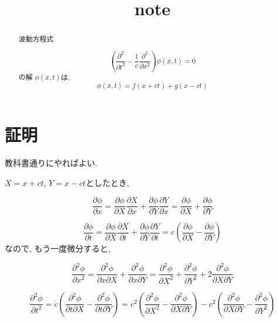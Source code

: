 \documentclass{jsarticle} \usepackage[dvipdfmx]{graphicx} \usepackage[dvipdfmx]{hyperref}
\title{note}
\begin{document}
\maketitle

\begin{abstract}
  波動方程式
  
  \begin{equation}
    \left( \frac{\partial^2}{\partial t^2} - \frac{1}{c}\frac{\partial^2}{\partial x^2} \right) \phi(x, t) = 0
  \end{equation}
  の解 $\phi(x, t)$は, 
  \begin{equation}
    \phi(x, t) = f(x + ct) + g(x - ct)
  \end{equation}
\end{abstract}

\section{証明}
教科書通りにやればよい. 

$X = x + ct$, $Y = x - ct$としたとき, 

\begin{equation}
  \frac{\partial \phi}{\partial x}
    = \frac{\partial \phi}{\partial X}\frac{\partial X}{\partial x}
    + \frac{\partial \phi}{\partial Y}\frac{\partial Y}{\partial x}
    = \frac{\partial \phi}{\partial X} + \frac{\partial \phi}{\partial Y}
\end{equation}

\begin{equation}
  \frac{\partial \phi}{\partial t}
    = \frac{\partial \phi}{\partial X}\frac{\partial X}{\partial t}
    + \frac{\partial \phi}{\partial Y}\frac{\partial Y}{\partial t}
    = c \left( \frac{\partial \phi}{\partial X} - \frac{\partial \phi}{\partial Y} \right)
\end{equation}
なので, もう一度微分すると, 

\begin{equation}
  \frac{\partial^2 \phi}{\partial x^2} = \frac{\partial^2 \phi}{\partial x \partial X} + \frac{\partial^2 \phi}{\partial x \partial Y}
  = \frac{\partial^2 \phi}{\partial X^2} + \frac{\partial^2 \phi}{\partial Y^2} + 2\frac{\partial^2 \phi}{\partial X \partial Y}
\end{equation}

\begin{equation}
  \frac{\partial^2 \phi}{\partial t^2} = c \left( \frac{\partial^2 \phi}{\partial t \partial X} - \frac{\partial^2 \phi}{\partial t \partial Y} \right)
  = c^2 \left( \frac{\partial^2 \phi}{\partial X^2} - \frac{\partial^2 \phi}{\partial X \partial Y} \right) - c^2 \left( \frac{\partial^2 \phi}{\partial X \partial Y} - \frac{\partial^2 \phi}{\partial Y^2} \right)
\end{equation}
\end{document}
